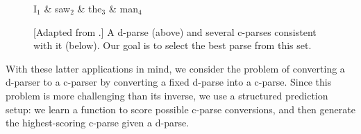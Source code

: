 \documentclass[11pt,letterpaper]{article}
\newcommand{\nascomment}[1]{\textcolor{blue}{\bf \small [#1 --nas]}}
\begin{document}
\begin{figure}
  \centering

  \vspace{-1cm}

  \begin{dependency}[theme=simple]
    \begin{deptext}[column sep=0.7cm]
      I$_1$ \& saw$_2$ \& the$_3$ \& man$_4$ \\
    \end{deptext}
  \end{dependency}

  
  \label{fig:inverse}
  \caption{{\footnotesize 
      [Adapted from \cite{collins1999statistical}.] A d-parse (above)
      and several c-parses consistent with it (below).  Our goal is to select
      the best parse from this set.
    }
    }
\end{figure}


With these latter applications in mind, we consider the problem of converting
a d-parser to a c-parser by converting a fixed d-parse into a c-parse.
Since this problem is more challenging than its inverse, we use a
structured prediction setup: we learn a function to score possible
c-parse conversions, and then generate the highest-scoring c-parse
given a d-parse.



\end{document}
